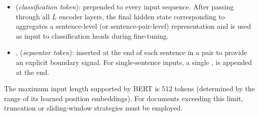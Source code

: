 \begin{itemize}
  \item \cls{} (\emph{classification token}): prepended to every input sequence.
        After passing through all $L$ encoder layers, the final hidden state
        corresponding to \cls{} aggregates a sentence-level (or sentence-pair-level)
        representation and is used as input to classification heads during
        fine-tuning.

  \item \sep{} (\emph{separator token}): inserted at the end of each sentence in a
        pair to provide an explicit boundary signal.  For single-sentence inputs, a
        single \sep{} is appended at the end.
\end{itemize}

\begin{remark}
  The maximum input length supported by BERT is 512 tokens (determined by the
  range of its learned position embeddings).  For documents exceeding this limit,
  truncation or sliding-window strategies must be employed.
\end{remark}
